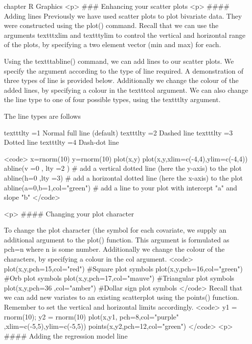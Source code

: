



chapter { R Graphics}
<p>
###  Enhancing your scatter plots
<p>
#### {Adding lines}
Previously we have used scatter plots to plot bivariate data. They were constructed using the plot() command.
Recall that we can use the arguments texttt{xlim} and texttt{ylim} to control the vertical and horizontal range of the plots, by specifying a two element vector (min and max) for each.

Using the texttt{abline()} command, we can add lines to our scatter plots. We specify the argument according to the type of line required. A demonstration of three types of line is provided below.
Additionally we change the colour of the added lines, by specifying a colour in the texttt{col} argument. We can also change the line type to one of four possible types, using the texttt{lty} argument.

The line types are follows

      	texttt{lty =1}   Normal full line (default)
      	texttt{lty =2}   Dashed line
      	texttt{lty =3}   Dotted line
      	texttt{lty =4}   Dash-dot line

 <code>
x=rnorm(10)
y=rnorm(10)
plot(x,y)
plot(x,y,xlim=c(-4,4),ylim=c(-4,4))
abline(v =0 , lty =2 )    # add a vertical dotted line (here the y-axis) to the plot
abline(h=0  ,lty =3)    # add a horizontal dotted line (here the x-axis) to the plot
abline(a=0,b=1,col="green") # add a line to your plot with intercept "a" and slope "b"
 </code>

<p>
#### {Changing your plot character}

To change the plot character (the symbol for each covariate, we supply an additional argument to the plot() function.  This argument is formulated as pch=n where n is some number.
Additionally we change the colour of the characters, by specifying a colour in the col argument.
 <code>
plot(x,y,pch=15,col="red")		#Square plot symbols
plot(x,y,pch=16,col="green")		#Orb plot symbols
plot(x,y,pch=17,col="mauve")		#Triangular plot symbols
plot(x,y,pch=36	,col="amber")		#Dollar sign plot symbols
</code>
Recall that we can add new variates to an existing scatterplot using the points() function. Remember to set the vertical and horizontal limits accordingly.
 <code>
y1 = rnorm(10); y2 = rnorm(10)
plot(x,y1, pch=8,col="purple" ,xlim=c(-5,5),ylim=c(-5,5))
points(x,y2,pch=12,col="green")
</code>
<p>
#### {Adding the regression model line}

